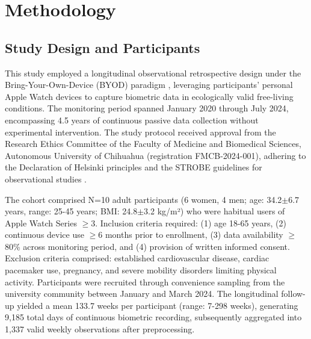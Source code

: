 
\section{Methodology}
\label{sec:methodology}

\subsection{Study Design and Participants}
\label{subsec:design}

This study employed a longitudinal observational retrospective design under the Bring-Your-Own-Device (BYOD) paradigm \cite{Liu2022}, leveraging participants' personal Apple Watch devices to capture biometric data in ecologically valid free-living conditions. The monitoring period spanned January 2020 through July 2024, encompassing 4.5 years of continuous passive data collection without experimental intervention. The study protocol received approval from the Research Ethics Committee of the Faculty of Medicine and Biomedical Sciences, Autonomous University of Chihuahua (registration FMCB-2024-001), adhering to the Declaration of Helsinki principles \cite{WMA2013} and the STROBE guidelines for observational studies \cite{VonElm2007STROBE}.

The cohort comprised N=10 adult participants (6 women, 4 men; age: 34.2$\pm$6.7 years, range: 25-45 years; BMI: 24.8$\pm$3.2 kg/m²) who were habitual users of Apple Watch Series $\geq$3. Inclusion criteria required: (1) age 18-65 years, (2) continuous device use $\geq$6 months prior to enrollment, (3) data availability $\geq$80\% across monitoring period, and (4) provision of written informed consent. Exclusion criteria comprised: established cardiovascular disease, cardiac pacemaker use, pregnancy, and severe mobility disorders limiting physical activity. Participants were recruited through convenience sampling from the university community between January and March 2024. The longitudinal follow-up yielded a mean 133.7 weeks per participant (range: 7-298 weeks), generating 9,185 total days of continuous biometric recording, subsequently aggregated into 1,337 valid weekly observations after preprocessing.

